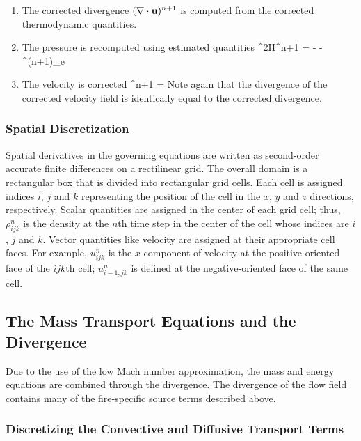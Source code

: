 \documentclass[11pt]{book}
\begin{document}
\begin{enumerate}
\item The corrected divergence $(\nabla \cdot {\bf u})^{n+1}$ is computed from the
corrected thermodynamic quantities.

\item The pressure is recomputed using estimated quantities
\be
\label{eqn_corrector_poisson}
\nabla^2{\cal H}^{n+1} = -  - \nabla \cdot \bF^{(n+1)_e}
\ee

\item The velocity is corrected
\be \bu^{n+1} = \ha {} \ee
Note again that the divergence of the corrected velocity field is
identically equal to the corrected divergence.

\end{enumerate}

\subsubsection{Spatial Discretization}

Spatial derivatives in the governing equations are written as second-order accurate
finite differences on a rectilinear grid. The overall
domain is a rectangular box that is divided into rectangular grid cells.
Each cell is assigned indices $i$, $j$ and $k$ representing the
position of the cell in the $x$, $y$ and $z$ directions, respectively.
Scalar quantities are assigned in the center of each grid cell; thus,
$\rho_{ijk}^n$ is the density at the $n$th time step in the center
of the cell whose indices are $i$, $j$ and $k$. Vector quantities like
velocity are assigned at their appropriate cell faces. For example,
$u_{ijk}^n$ is the $x$-component of velocity at the
positive-oriented face of the $ijk$th cell; $u_{i-1,jk}^n$ is defined at the
negative-oriented face of the same cell.


\clearpage
\subsection{The Mass Transport Equations and the Divergence}

Due to the use of the low Mach number approximation, the
mass and energy equations are combined through the divergence. The
divergence of the flow field contains
many of the fire-specific source terms described above.

\subsubsection{Discretizing the Convective and Diffusive Transport Terms}
\end{document}
